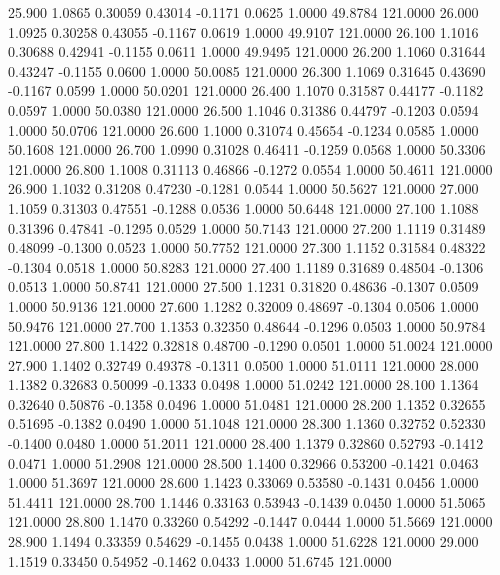   25.900   1.0865   0.30059   0.43014  -0.1171   0.0625   1.0000  49.8784 121.0000
  26.000   1.0925   0.30258   0.43055  -0.1167   0.0619   1.0000  49.9107 121.0000
  26.100   1.1016   0.30688   0.42941  -0.1155   0.0611   1.0000  49.9495 121.0000
  26.200   1.1060   0.31644   0.43247  -0.1155   0.0600   1.0000  50.0085 121.0000
  26.300   1.1069   0.31645   0.43690  -0.1167   0.0599   1.0000  50.0201 121.0000
  26.400   1.1070   0.31587   0.44177  -0.1182   0.0597   1.0000  50.0380 121.0000
  26.500   1.1046   0.31386   0.44797  -0.1203   0.0594   1.0000  50.0706 121.0000
  26.600   1.1000   0.31074   0.45654  -0.1234   0.0585   1.0000  50.1608 121.0000
  26.700   1.0990   0.31028   0.46411  -0.1259   0.0568   1.0000  50.3306 121.0000
  26.800   1.1008   0.31113   0.46866  -0.1272   0.0554   1.0000  50.4611 121.0000
  26.900   1.1032   0.31208   0.47230  -0.1281   0.0544   1.0000  50.5627 121.0000
  27.000   1.1059   0.31303   0.47551  -0.1288   0.0536   1.0000  50.6448 121.0000
  27.100   1.1088   0.31396   0.47841  -0.1295   0.0529   1.0000  50.7143 121.0000
  27.200   1.1119   0.31489   0.48099  -0.1300   0.0523   1.0000  50.7752 121.0000
  27.300   1.1152   0.31584   0.48322  -0.1304   0.0518   1.0000  50.8283 121.0000
  27.400   1.1189   0.31689   0.48504  -0.1306   0.0513   1.0000  50.8741 121.0000
  27.500   1.1231   0.31820   0.48636  -0.1307   0.0509   1.0000  50.9136 121.0000
  27.600   1.1282   0.32009   0.48697  -0.1304   0.0506   1.0000  50.9476 121.0000
  27.700   1.1353   0.32350   0.48644  -0.1296   0.0503   1.0000  50.9784 121.0000
  27.800   1.1422   0.32818   0.48700  -0.1290   0.0501   1.0000  51.0024 121.0000
  27.900   1.1402   0.32749   0.49378  -0.1311   0.0500   1.0000  51.0111 121.0000
  28.000   1.1382   0.32683   0.50099  -0.1333   0.0498   1.0000  51.0242 121.0000
  28.100   1.1364   0.32640   0.50876  -0.1358   0.0496   1.0000  51.0481 121.0000
  28.200   1.1352   0.32655   0.51695  -0.1382   0.0490   1.0000  51.1048 121.0000
  28.300   1.1360   0.32752   0.52330  -0.1400   0.0480   1.0000  51.2011 121.0000
  28.400   1.1379   0.32860   0.52793  -0.1412   0.0471   1.0000  51.2908 121.0000
  28.500   1.1400   0.32966   0.53200  -0.1421   0.0463   1.0000  51.3697 121.0000
  28.600   1.1423   0.33069   0.53580  -0.1431   0.0456   1.0000  51.4411 121.0000
  28.700   1.1446   0.33163   0.53943  -0.1439   0.0450   1.0000  51.5065 121.0000
  28.800   1.1470   0.33260   0.54292  -0.1447   0.0444   1.0000  51.5669 121.0000
  28.900   1.1494   0.33359   0.54629  -0.1455   0.0438   1.0000  51.6228 121.0000
  29.000   1.1519   0.33450   0.54952  -0.1462   0.0433   1.0000  51.6745 121.0000
